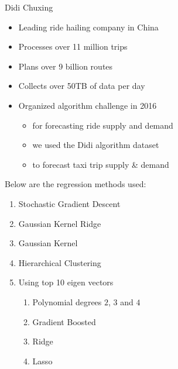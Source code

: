 \documentclass[landscape,a0paper,fontscale=0.285]{baposter} %
\newcommand{\compresslist}{ %
\setlength{\itemsep}{1pt}
\setlength{\parskip}{0pt}
\setlength{\parsep}{0pt}
}
\begin{document}
\begin{poster}
{Didi Chuxing 
\begin{multicols}{2}
\begin{itemize}\compresslist
\item Leading ride hailing company in China
\item Processes over 11 million trips
\item Plans over 9 billion routes
\item Collects over 50TB of data per day
\item Organized algorithm challenge in 2016 \cite{DidiPage}
\begin{itemize}\compresslist
\item for forecasting ride supply and demand
\item we used the Didi algorithm dataset
\item to forecast taxi trip supply \& demand
\end{itemize}
\end{itemize}
\end{multicols}
Below are the regression methods used:

\begin{multicols}{2}
\begin{enumerate}\compresslist
\item Stochastic Gradient Descent
\item Gaussian Kernel Ridge 
\item Gaussian Kernel 
\item Hierarchical Clustering\\
\item Using top 10 eigen vectors
\begin{enumerate}\compresslist
\item Polynomial degrees $2$, $3$ and $4$
\item Gradient Boosted 
\item Ridge
\item Lasso
\end{enumerate}
\end{enumerate}
\end{multicols}

\vspace{0.3em} %
}



\end{poster}
\end{document}
